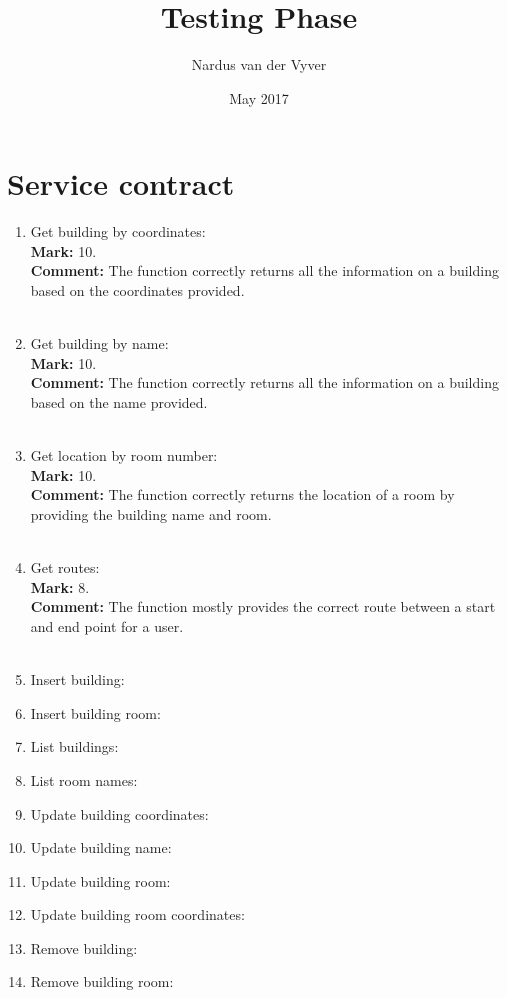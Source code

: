 \documentclass{article}
\title{Testing Phase}
\author{Nardus van der Vyver }
\date{May 2017}
\begin{document}
\maketitle

\section{Service contract}

\begin{enumerate}
    \item Get building by coordinates:\\
    \textbf{Mark: }
    10.\\
    \textbf{Comment:}
    The function correctly returns all the information on a building based on the coordinates provided.\\ \\
    
    \item Get building by name:\\
    \textbf{Mark: }
    10.\\
    \textbf{Comment:}
    The function correctly returns all the information on a building based on the name provided.\\ \\
    
    \item Get location by room number:\\
    \textbf{Mark: }
    10.\\
    \textbf{Comment:}
    The function correctly returns the location of a room by providing the building name and room.\\ \\
    
    \item Get routes:\\
    \textbf{Mark: }
    8.\\
    \textbf{Comment:}
    The function mostly provides the correct route between a start and end point for a user.\\ \\
    
    \item Insert building:
    
    \item Insert building room:
    
    \item List buildings:
    
    \item List room names:
    
    \item Update building coordinates:
    
    \item Update building name:
    
    \item Update building room:
    
    \item Update building room coordinates:
    
    \item Remove building:
    
    \item Remove building room:
\end{enumerate}
\end{document}
